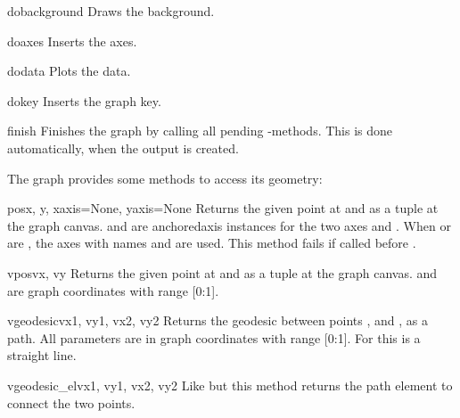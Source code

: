 \begin{methoddesc}{dobackground}{}
  Draws the background.
\end{methoddesc}

\begin{methoddesc}{doaxes}{}
  Inserts the axes.
\end{methoddesc}

\begin{methoddesc}{dodata}{}
  Plots the data.
\end{methoddesc}

\begin{methoddesc}{dokey}{}
  Inserts the graph key.
\end{methoddesc}

\begin{methoddesc}{finish}{}
  Finishes the graph by calling all pending -methods. This
  is done automatically, when the output is created.
\end{methoddesc}

The graph provides some methods to access its geometry:

\begin{methoddesc}{pos}{x, y, xaxis=None, yaxis=None}
  Returns the given point at  and  as a tuple
   at the graph canvas.  and  are
  anchoredaxis instances for the two axes  and .
  When  or  are , the axes with names
   and  are used. This method fails if called before
  .
\end{methoddesc}

\begin{methoddesc}{vpos}{vx, vy}
  Returns the given point at  and  as a tuple
   at the graph canvas.  and  are
  graph coordinates with range [0:1].
\end{methoddesc}

\begin{methoddesc}{vgeodesic}{vx1, vy1, vx2, vy2}
  Returns the geodesic between points ,  and
  ,  as a path. All parameters are in graph
  coordinates with range [0:1]. For  this is a straight
  line.
\end{methoddesc}

\begin{methoddesc}{vgeodesic\_el}{vx1, vy1, vx2, vy2}
  Like  but this method returns the path element to
  connect the two points.
\end{methoddesc}

